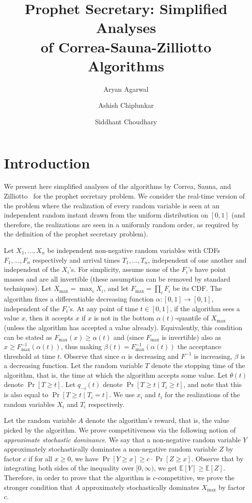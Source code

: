 \documentclass[10pt, letterpaper, twoside]{article}
\title{Prophet Secretary: Simplified Analyses\\ of Correa-Sauna-Zilliotto Algorithms}
\author{Aryan Agarwal \and Ashish Chiplunkar \and Siddhant Choudhary}
\date{}
\begin{document}
\maketitle

\section{Introduction}

We present here simplified analyses of the algorithms by Correa, Sauna, and Zilliotto~\cite{CorreaSZ19} for the prophet secretary problem. We consider the real-time version of the problem where the realization of every random variable is seen at an independent random instant drawn from the uniform distribution on $[0,1]$ (and therefore, the realizations are seen in a uniformly random order, as required by the definition of the prophet secretary problem).

Let $X_1,\ldots,X_n$ be independent non-negative random variables with CDFs $F_1,\ldots,F_n$ respectively and arrival times $T_1,\ldots,T_n$, independent of one another and independent of the $X_i$'s. For simplicity, assume none of the $F_i$'s have point masses and are all invertible (these assumption can be removed by standard techniques). Let $X_{\max}=\max_iX_i$, and let $F_{\max}=\prod_iF_i$ be its CDF. The algorithm fixes a differentiable decreasing function $\alpha:[0,1]\longrightarrow[0,1]$, independent of the $F_i$'s. At any point of time $t\in[0,1]$, if the algorithm sees a value $x$, then it accepts $x$ if $x$ is not in the bottom $\alpha(t)$-quantile of $X_{\max}$ (unless the algorithm has accepted a value already). Equivalently, this condition can be stated as $F_{\max}(x)\geq\alpha(t)$ and (since $F_{\max}$ is invertible) also as $x\geq F_{\max}^{-1}(\alpha(t))$, thus making $\beta(t)=F_{\max}^{-1}(\alpha(t))$ the acceptance threshold at time $t$. Observe that since $\alpha$ is decreasing and $F^{-1}$ is increasing, $\beta$ is a decreasing function. Let the random variable $T$ denote the stopping time of the algorithm, that is, the time at which the algorithm accepts some value. Let $\theta(t)$ denote $\Pr[T\geq t]$. Let $q_{-i}(t)$ denote $\Pr[T\geq t\mid T_i\geq t]$, and note that this is also equal to $\Pr[T\geq t\mid T_i=t]$. We use $x_i$ and $t_i$ for the realizations of the random variables $X_i$ and $T_i$ respectively.

Let the random variable $A$ denote the algorithm's reward, that is, the value picked by the algorithm. We prove competitiveness via the following notion of \textit{approximate stochastic dominance}. We say that a non-negative random variable $Y$ approximately stochastically dominates a non-negative random variable $Z$ by factor $c$ if for all $x\geq0$, we have $\Pr[Y\geq x]\geq c\cdot\Pr[Z\geq x]$. Observe that by integrating both sides of the inequality over $[0,\infty)$, we get $\mathbb{E}[Y]\geq\mathbb{E}[Z]$. Therefore, in order to prove that the algorithm is $c$-competitive, we prove the stronger condition that $A$ approximately stochastically dominates $X_{\max}$ by factor $c$.
\end{document}
